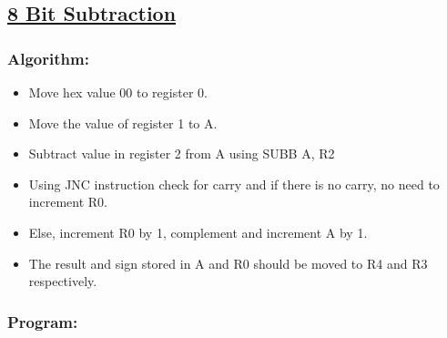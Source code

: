 \documentclass[12pt,a4paper]{article}
\begin{document}
\begin{flushleft}
\subsection*{\textbf{\underline{8 Bit Subtraction}}}

\subsubsection*{\textbf{Algorithm:}}
\begin{itemize}
    \item Move hex value 00 to register 0. 
    \item Move the value of register 1 to A.
    \item Subtract value in register 2 from A using SUBB A, R2
    \item Using JNC instruction check for carry and if there is no carry, no need to increment R0.
    \item Else, increment R0 by 1, complement and increment A by 1. 
    \item The result and sign stored in A and R0 should be moved to R4 and R3 respectively.
\end{itemize}

\newpage
\subsubsection*{\textbf{Program:}}


\end{flushleft}
\end{document}
